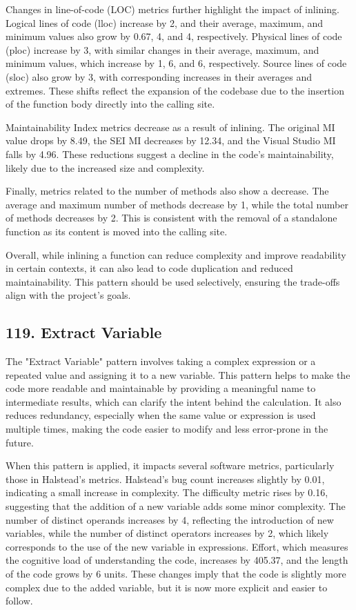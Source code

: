 Changes in line-of-code (LOC) metrics further highlight the impact of inlining. Logical lines of code (lloc) increase by 2, and their average, maximum, and minimum values also grow by 0.67, 4, and 4, respectively. Physical lines of code (ploc) increase by 3, with similar changes in their average, maximum, and minimum values, which increase by 1, 6, and 6, respectively. Source lines of code (sloc) also grow by 3, with corresponding increases in their averages and extremes. These shifts reflect the expansion of the codebase due to the insertion of the function body directly into the calling site.

Maintainability Index metrics decrease as a result of inlining. The original MI value drops by 8.49, the SEI MI decreases by 12.34, and the Visual Studio MI falls by 4.96. These reductions suggest a decline in the code's maintainability, likely due to the increased size and complexity.

Finally, metrics related to the number of methods also show a decrease. The average and maximum number of methods decrease by 1, while the total number of methods decreases by 2. This is consistent with the removal of a standalone function as its content is moved into the calling site.

Overall, while inlining a function can reduce complexity and improve readability in certain contexts, it can also lead to code duplication and reduced maintainability. This pattern should be used selectively, ensuring the trade-offs align with the project's goals.

\subsection{119. Extract Variable}

The "Extract Variable" pattern involves taking a complex expression or a repeated value and assigning it to a new variable. This pattern helps to make the code more readable and maintainable by providing a meaningful name to intermediate results, which can clarify the intent behind the calculation. It also reduces redundancy, especially when the same value or expression is used multiple times, making the code easier to modify and less error-prone in the future.

When this pattern is applied, it impacts several software metrics, particularly those in Halstead's metrics. Halstead's bug count increases slightly by 0.01, indicating a small increase in complexity. The difficulty metric rises by 0.16, suggesting that the addition of a new variable adds some minor complexity. The number of distinct operands increases by 4, reflecting the introduction of new variables, while the number of distinct operators increases by 2, which likely corresponds to the use of the new variable in expressions. Effort, which measures the cognitive load of understanding the code, increases by 405.37, and the length of the code grows by 6 units. These changes imply that the code is slightly more complex due to the added variable, but it is now more explicit and easier to follow.

